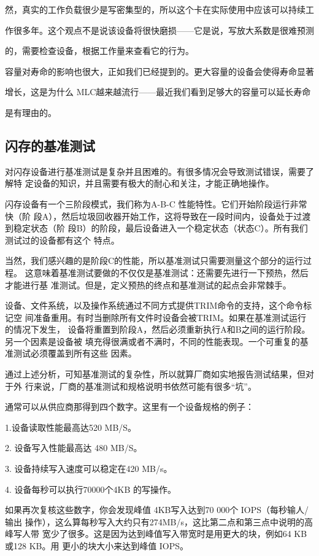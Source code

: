 然，真实的工作负载很少是写密集型的，所以这个卡在实际使用中应该可以持续工

作很多年。这个观点不是说该设备将很快磨损——它是说，写放大系数是很难预测

的，需要检查设备，根据工作量来查看它的行为。

容量对寿命的影响也很大，正如我们已经提到的。更大容量的设备会使得寿命显著

增长，这是为什么 MLC越来越流行——最近我们看到足够大的容量可以延长寿命

是有理由的。

\subsection{闪存的基准测试}
对闪存设备进行基准测试是复杂并且困难的。有很多情况会导致测试错误，需要了解特
定设备的知识，并且需要有极大的耐心和关注，才能正确地操作。

闪存设备有一个三阶段模式，我们称为A-B-C 性能特性。它们开始阶段运行非常快（阶
段A），然后垃圾回收器开始工作，这将导致在一段时间内，设备处于过渡到稳定状态（阶
段B）的阶段，最后设备进入一个稳定状态（状态C）。所有我们测试过的设备都有这个
特点。

当然，我们感兴趣的是阶段C的性能，所以基准测试只需要测量这个部分的运行过程。
这意味着基准测试要做的不仅仅是基准测试：还需要先进行一下预热，然后才能进行基
准测试。但是，定义预热的终点和基准测试的起点会非常棘手。

设备、文件系统，以及操作系统通过不同方式提供TRIM命令的支持，这个命令标记空
间准备重用。有时当删除所有文件时设备会被TRIM。如果在基准测试运行的情况下发生，
设备将重置到阶段A，然后必须重新执行A和B之间的运行阶段。另一个因素是设备被
填充得很满或者不满时，不同的性能表现。一个可重复的基准测试必须覆盖到所有这些
因素。

通过上述分析，可知基准测试的复杂性，所以就算厂商如实地报告测试结果，但对于外
行来说，厂商的基准测试和规格说明书依然可能有很多“坑”。

通常可以从供应商那得到四个数字。这里有一个设备规格的例子：

1.设备读取性能最高达520 MB/S。

2. 设备写入性能最高达 480 MB/S。

3. 设备持续写入速度可以稳定在420 MB/s。

4. 设备每秒可以执行70000个4KB 的写操作。

如果再次复核这些数字，你会发现峰值 4KB写入达到70 000个 IOPS（每秒输人/输出
操作），这么算每秒写入大约只有274MB/s，这比第二点和第三点中说明的高峰写人带
宽少了很多。这是因为达到峰值写入带宽时是用更大的块，例如64 KB或128 KB。用
更小的块大小来达到峰值 IOPS。

